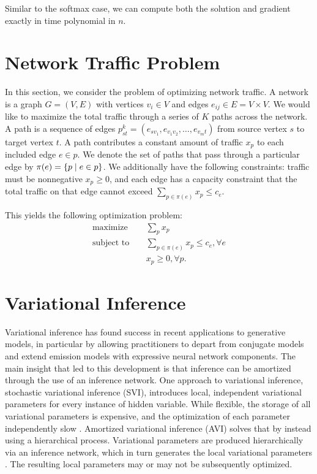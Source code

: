 \documentclass[11pt]{article}
\begin{document}
Similar to the softmax case, we can compute both the solution and gradient
exactly in time polynomial in $n$.

\section{Network Traffic Problem}
In this section, we consider the problem of optimizing network traffic.
A network is a graph $G = (V,E)$ with vertices $v_i\in V$ and edges
$e_{ij}\in E = V\times V$.
We would like to maximize the total traffic through a series of $K$ paths across the network.
A path is a sequence of edges $p_{st}^k = (e_{sv_1},e_{v_1v_2},\ldots,e_{v_mt})$
from source vertex $s$ to target vertex $t$.
A path contributes a constant amount of traffic $x_p$ to each included edge $e\in p$.
We denote the set of paths that pass through a particular edge by
$\pi(e) = \left\{p \mid e \in p\right\}$.
We additionally have the following constraints: traffic must be nonnegative $x_p \geq 0$,
and each edge has a capacity constraint that the total traffic on that
edge cannot exceed $\sum_{p\in\pi(e)} x_p \le c_e$.

This yields the following optimization problem:
\begin{equation}
\label{eqn:network-opt}
\begin{aligned}
\textrm{maximize } \quad & \sum_{p} x_p\\
\textrm{subject to } &\sum_{p\in\pi(e)}x_p \le c_e, \forall e\\
& x_p \geq 0, \forall p.
\end{aligned}
\end{equation}

\section{Variational Inference}
Variational inference has found success in recent applications to generative models,
in particular by allowing practitioners to depart from conjugate models
and extend emission models with expressive neural network components.
The main insight that led to this development is that inference can be amortized through
the use of an inference network.
One approach to variational inference, stochastic variational inference (SVI),
introduces local, independent variational parameters for every instance of hidden variable.
While flexible, the storage of all variational parameters is expensive, and the optimization
of each parameter independently slow \citep{}.
Amortized variational inference (AVI) solves that by instead using a hierarchical process.
Variational parameters are produced hierarchically via an inference network,
which in turn generates the local variational parameters \citep{}.
The resulting local parameters may or may not be subsequently optimized.
\end{document}
